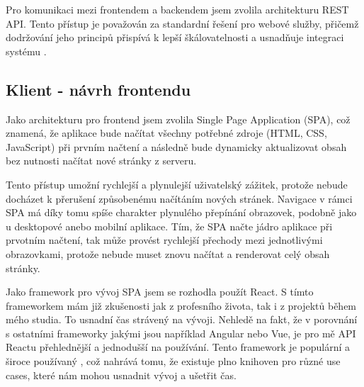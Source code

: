 Pro komunikaci mezi frontendem a backendem jsem zvolila architekturu REST API. Tento přístup je považován za standardní řešení pro webové služby, přičemž dodržování jeho principů přispívá k lepší škálovatelnosti a usnadňuje integraci systému \cite{google_rest_api}.

\subsection{Klient - návrh frontendu}
Jako architekturu pro frontend jsem zvolila Single Page Application (SPA), což znamená, že aplikace bude načítat všechny potřebné zdroje (HTML, CSS, JavaScript) při prvním načtení a následně bude dynamicky aktualizovat obsah bez nutnosti načítat nové stránky z serveru. \cite{guptaa_single_page_application} 

Tento přístup umožní rychlejší a plynulejší uživatelský zážitek, protože nebude docházet k přerušení způsobenému načítáním nových stránek. Navigace v rámci SPA má díky tomu spíše charakter plynulého přepínání obrazovek, podobně jako u desktopové anebo mobilní aplikace. Tím, že SPA načte jádro aplikace při prvotním načtení, tak může provést rychlejší přechody mezi jednotlivými obrazovkami, protože nebude muset znovu načítat a renderovat celý obsah stránky.
\cite{guide_spa}

Jako framework pro vývoj SPA jsem se rozhodla použít React. S tímto frameworkem mám již zkušenosti jak z profesního života, tak i z projektů během mého studia. To usnadní čas strávený na vývoji. Nehledě na fakt, že v porovnání s ostatními frameworky jakými jsou například Angular nebo Vue, je pro mě API Reactu přehlednější a jednodušší na používání. 
Tento framework je populární a široce používaný \cite{react_docs}, což nahrává tomu, že existuje plno knihoven pro různé use cases, které nám mohou usnadnit vývoj a ušetřit čas. 

